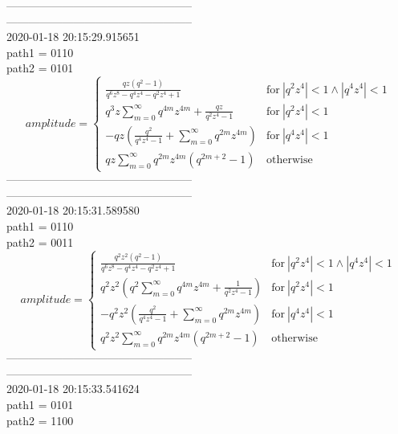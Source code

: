 --------------------------------------------------\\
--------------------------------------------------\\
2020-01-18 20:15:29.915651\\
path1 = 0110\\
path2 = 0101\\
$$amplitude = \begin{cases} \frac{q z \left(q^{2} - 1\right)}{q^{6} z^{8} - q^{4} z^{4} - q^{2} z^{4} + 1} & \text{for}\: \left|{q^{2} z^{4}}\right| < 1 \wedge \left|{q^{4} z^{4}}\right| < 1 \\q^{3} z \sum_{m=0}^{\infty} q^{4 m} z^{4 m} + \frac{q z}{q^{2} z^{4} - 1} & \text{for}\: \left|{q^{2} z^{4}}\right| < 1 \\- q z \left(\frac{q^{2}}{q^{4} z^{4} - 1} + \sum_{m=0}^{\infty} q^{2 m} z^{4 m}\right) & \text{for}\: \left|{q^{4} z^{4}}\right| < 1 \\q z \sum_{m=0}^{\infty} q^{2 m} z^{4 m} \left(q^{2 m + 2} - 1\right) & \text{otherwise} \end{cases}$$
--------------------------------------------------\\
--------------------------------------------------\\
2020-01-18 20:15:31.589580\\
path1 = 0110\\
path2 = 0011\\
$$amplitude = \begin{cases} \frac{q^{2} z^{2} \left(q^{2} - 1\right)}{q^{6} z^{8} - q^{4} z^{4} - q^{2} z^{4} + 1} & \text{for}\: \left|{q^{2} z^{4}}\right| < 1 \wedge \left|{q^{4} z^{4}}\right| < 1 \\q^{2} z^{2} \left(q^{2} \sum_{m=0}^{\infty} q^{4 m} z^{4 m} + \frac{1}{q^{2} z^{4} - 1}\right) & \text{for}\: \left|{q^{2} z^{4}}\right| < 1 \\- q^{2} z^{2} \left(\frac{q^{2}}{q^{4} z^{4} - 1} + \sum_{m=0}^{\infty} q^{2 m} z^{4 m}\right) & \text{for}\: \left|{q^{4} z^{4}}\right| < 1 \\q^{2} z^{2} \sum_{m=0}^{\infty} q^{2 m} z^{4 m} \left(q^{2 m + 2} - 1\right) & \text{otherwise} \end{cases}$$
--------------------------------------------------\\
--------------------------------------------------\\
2020-01-18 20:15:33.541624\\
path1 = 0101\\
path2 = 1100\\
